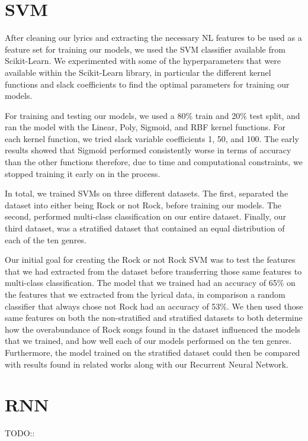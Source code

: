 \documentclass[journal]{IEEEtran}
\begin{document}
\section{SVM}

After cleaning our lyrics and extracting the necessary NL features to be used as a feature set for training our models, we used the SVM classifier available from Scikit-Learn. We experimented with some of the hyperparameters that were available within the Scikit-Learn library, in particular the different kernel functions and slack coefficients to find the optimal parameters for training our models.

For training and testing our models, we used a 80\% train and 20\% test split, and ran the model with the Linear, Poly, Sigmoid, and RBF kernel functions. For each kernel function, we tried slack variable coefficients 1, 50, and 100. The early results showed that Sigmoid performed consistently worse in terms of accuracy than the other functions therefore, due to time and computational constraints, we stopped training it early on in the process.

	In total, we trained SVMs on three different datasets. The first, separated the dataset into either being Rock or not Rock, before training our models. The second, performed multi-class classification on our entire dataset. Finally, our third dataset, was a stratified dataset that contained an equal distribution of each of the ten genres.
	
	Our initial goal for creating the Rock or not Rock SVM was to test the features that we had extracted from the dataset before transferring those same features to multi-class classification. The model that we trained had an accuracy of 65\% on the features that we extracted from the lyrical data, in comparison a random classifier that always chose not Rock had an accuracy of 53\%. We then used those same features on both the non-stratified and stratified datasets to both determine how the overabundance of Rock songs found in the dataset influenced the models that we trained, and how well each of our models performed on the ten genres. Furthermore, the model trained on the stratified dataset could then be compared with results found in related works along with our Recurrent Neural Network.  


\section{RNN}

TODO::
\end{document}
